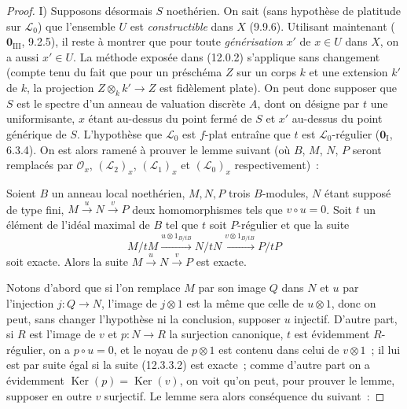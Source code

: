 \begin{proof}
\medskip
I) Supposons désormais $S$ noethérien. On sait (sans hypothèse de platitude sur
$\mathcal L_0$) que l'ensemble $U$ est \emph{constructible} dans $X$ (9.9.6).
Utilisant maintenant ($\mathbf 0_{\mathrm{III}}$, 9.2.5), il reste à montrer
que pour toute \emph{générisation} $x'$ de $x\in U$ dans $X$, on a aussi
$x'\in U$. La méthode exposée dans (12.0.2) s'applique sans changement (compte
tenu du fait que pour un préschéma $Z$ sur un corps $k$ et une extension $k'$
de $k$, la projection $Z\otimes_k k'\to Z$ est fidèlement plate). On peut donc
supposer que $S$ est le spectre d'un anneau de valuation discrète $A$, dont on
désigne par $t$ une uniformisante, $x$ étant au-dessus du point fermé de $S$ et
$x'$ au-dessus du point générique de $S$. L'hypothèse que $\mathcal L_0$ est
$f$-plat entraîne que $t$ est $\mathcal L_0$-régulier
($\mathbf 0_{\mathrm I}$, 6.3.4). On est alors ramené à prouver le lemme suivant
(où $B$, $M$, $N$, $P$ seront remplacés par $\mathcal O_x$,
$(\mathcal L_2)_x$, $(\mathcal L_1)_x$ et $(\mathcal L_0)_x$ respectivement)~:

\begin{lemma}[12.3.3.1]
\label{IV.12.3.3.1-fr}
Soient $B$ un anneau local noethérien, $M,N,P$ trois $B$-modules, $N$ étant
supposé de type fini, $M\xrightarrow{u}N\xrightarrow{v}P$ deux homomorphismes
tels que $v\circ u=0$. Soit $t$ un élément de l'idéal maximal de $B$ tel que
$t$ soit $P$-régulier et que la suite
\begin{equation}
  \tag{12.3.3.2}
  \label{IV.12.3.3.2-fr}
  M/tM\xrightarrow{u\otimes1_{B/tB}}N/tN
  \xrightarrow{v\otimes1_{B/tB}}P/tP
\end{equation}
soit exacte. Alors la suite $M\xrightarrow{u}N\xrightarrow{v}P$ est exacte.
\end{lemma}

Notons d'abord que si l'on remplace $M$ par son image $Q$ dans $N$ et $u$ par
l'injection $j:Q\to N$, l'image de $j\otimes1$ est la même que celle de
$u\otimes1$, donc on peut, sans changer l'hypothèse ni la conclusion,
supposer $u$ injectif. D'autre part, si $R$ est l'image de $v$ et
$p:N\to R$ la surjection canonique, $t$ est évidemment $R$-régulier, on a
$p\circ u=0$, et le noyau de $p\otimes1$ est contenu dans celui de
$v\otimes1$~; il lui est par suite égal si la suite (12.3.3.2) est exacte~;
comme d'autre part on a évidemment $\operatorname{Ker}(p)
=\operatorname{Ker}(v)$,
on voit qu'on peut, pour prouver le lemme, supposer en
outre $v$ surjectif. Le lemme sera alors conséquence du suivant~:


\end{proof}
